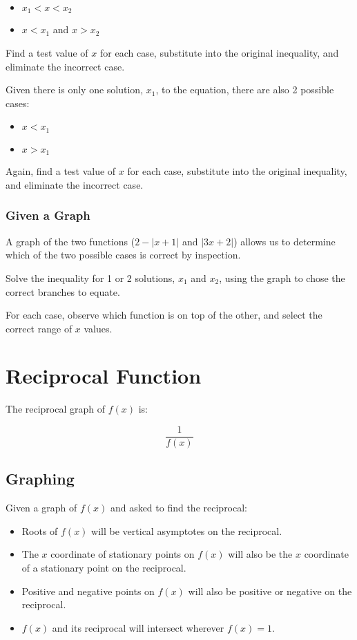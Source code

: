 \documentclass[a4paper,11pt]{report}
\begin{document}
\begin{itemize}
\item $x_1 < x < x_2$
\item $x < x_1$ and $x > x_2$
\end{itemize}

Find a test value of $x$ for each case, substitute into the original inequality,
and eliminate the incorrect case.

Given there is only one solution, $x_1$, to the equation, there are also 2
possible cases:

\begin{itemize}
\item $x < x_1$
\item $x > x_1$
\end{itemize}

Again, find a test value of $x$ for each case, substitute into the original
inequality, and eliminate the incorrect case.

\subsubsection{Given a Graph}

A graph of the two functions ($2 - \lvert x + 1 \rvert$ and
$\lvert 3x + 2 \rvert$) allows us to determine which of the two possible cases
is correct by inspection.

Solve the inequality for 1 or 2 solutions, $x_1$ and $x_2$, using the graph to
chose the correct branches to equate.

For each case, observe which function is on top of the other, and select the
correct range of $x$ values.


\section{Reciprocal Function}

The reciprocal graph of $f(x)$ is:

$$
\frac{1}{f(x)}
$$

\subsection{Graphing}

Given a graph of $f(x)$ and asked to find the reciprocal:

\begin{itemize}
\item Roots of $f(x)$ will be vertical asymptotes on the reciprocal.
\item The $x$ coordinate of stationary points on $f(x)$ will also be the $x$
	coordinate of a stationary point on the reciprocal.
\item Positive and negative points on $f(x)$ will also be positive or negative
	on the reciprocal.
\item $f(x)$ and its reciprocal will intersect wherever $f(x) = 1$.
\end{itemize}
\end{document}
